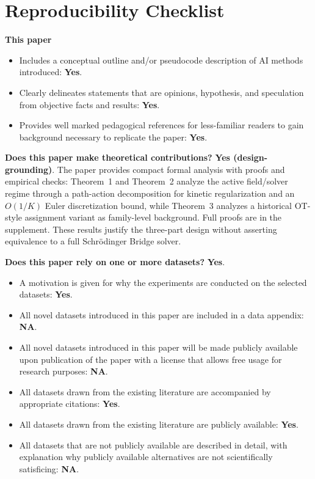 \documentclass[letterpaper]{article}
\begin{document}


\footnotesize
\setlength{\itemsep}{0pt}
\setlength{\parskip}{1pt}
\section*{Reproducibility Checklist}
\noindent\textbf{This paper}
\begin{itemize}
\item Includes a conceptual outline and/or pseudocode description of AI methods introduced: \textbf{Yes}.
\item Clearly delineates statements that are opinions, hypothesis, and speculation from objective facts and results: \textbf{Yes}.
\item Provides well marked pedagogical references for less-familiar readers to gain background necessary to replicate the paper: \textbf{Yes}.
\end{itemize}

\noindent\textbf{Does this paper make theoretical contributions?} \textbf{Yes (design-grounding)}. The paper provides compact formal analysis with proofs and empirical checks: Theorem~1 and Theorem~2 analyze the active field/solver regime through a path-action decomposition for kinetic regularization and an $O(1/K)$ Euler discretization bound, while Theorem~3 analyzes a historical OT-style assignment variant as family-level background. Full proofs are in the supplement. These results justify the three-part design without asserting equivalence to a full Schr\"odinger Bridge solver.

\noindent\textbf{Does this paper rely on one or more datasets?} \textbf{Yes}.
\begin{itemize}
\item A motivation is given for why the experiments are conducted on the selected datasets: \textbf{Yes}.
\item All novel datasets introduced in this paper are included in a data appendix: \textbf{NA}.
\item All novel datasets introduced in this paper will be made publicly available upon publication of the paper with a license that allows free usage for research purposes: \textbf{NA}.
\item All datasets drawn from the existing literature are accompanied by appropriate citations: \textbf{Yes}.
\item All datasets drawn from the existing literature are publicly available: \textbf{Yes}.
\item All datasets that are not publicly available are described in detail, with explanation why publicly available alternatives are not scientifically satisficing: \textbf{NA}.
\end{itemize}
\end{document}
